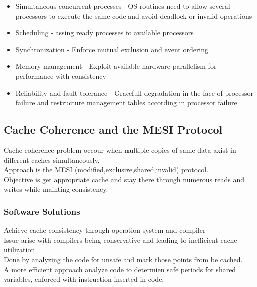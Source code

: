 \documentclass[12pt, a4paper]{article}
\begin{document}
			\begin{itemize}
				\item Simultaneous concurrent processes - OS routines need to allow several processors to execute the same code and avoid deadlock or invalid operations
				\item Scheduling - assing ready processes to available processors
				\item Synchronization - Enforce mutual exclusion and event ordering
				\item Memory management - Exploit available hardware parallelism for performance with consistency
				\item Reliability and fault tolerance - Gracefull degradation in the face of processor failure and restructure management tables according in processor failure
			\end{itemize}
		\subsection{Cache Coherence and the MESI Protocol}
			Cache coherence problem occour when multiple copies of same data axist in different caches simultaneously.\\
			Approach is the MESI (modified,exclusive,shared,invalid) protocol.\\
			Objective is get appropriate cache and stay there through numerous reads and writes while mainting consistency.\\
			\subsubsection{Software Solutions}
				Achieve cache consistency through operation system and compiler\\
				Issue arise with compilers being conservative and leading to inefficient cache utilization\\
				Done by analyzing the code for unsafe and mark those points from be cached.\\
				A more efficient approach analyze code to determien safe periods for shared variables, enforced with instruction inserted in code.\\
\end{document}

